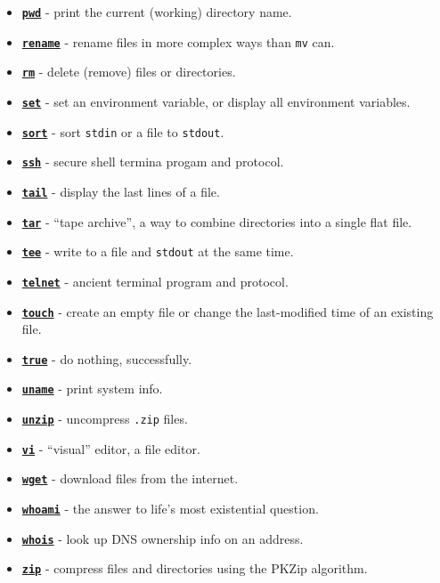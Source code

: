 \documentclass[10pt,]{book}
\numberwithin{figure}{chapter}
\begin{document}
\begin{itemize}
\item
  \href{linux.die.net/man/1/pwd}{\textbf{\texttt{pwd}}} - print the
  current (working) directory name.
\item
  \href{linux.die.net/man/1/rename}{\textbf{\texttt{rename}}} - rename
  files in more complex ways than \texttt{mv} can.
\item
  \href{linux.die.net/man/1/rm}{\textbf{\texttt{rm}}} - delete (remove)
  files or directories.
\item
  \href{linux.die.net/man/1/set}{\textbf{\texttt{set}}} - set an
  environment variable, or display all environment variables.
\item
  \href{linux.die.net/man/1/sort}{\textbf{\texttt{sort}}} - sort
  \texttt{stdin} or a file to \texttt{stdout}.
\item
  \href{http://linux.die.net/man/1/ssh}{\textbf{\texttt{ssh}}} - secure
  shell termina progam and protocol.
\item
  \href{http://linux.die.net/man/1/tail}{\textbf{\texttt{tail}}} -
  display the last lines of a file.
\item
  \href{http://linux.die.net/man/1/tar}{\textbf{\texttt{tar}}} - ``tape
  archive'', a way to combine directories into a single flat file.
\item
  \href{http://linux.die.net/man/1/tee}{\textbf{\texttt{tee}}} - write
  to a file and \texttt{stdout} at the same time.
\item
  \href{http://linux.die.net/man/1/telnet}{\textbf{\texttt{telnet}}} -
  ancient terminal program and protocol.
\item
  \href{http://linux.die.net/man/1/touch}{\textbf{\texttt{touch}}} -
  create an empty file or change the last-modified time of an existing
  file.
\item
  \href{http://linux.die.net/man/1/true}{\textbf{\texttt{true}}} - do
  nothing, successfully.
\item
  \href{http://linux.die.net/man/1/uname}{\textbf{\texttt{uname}}} -
  print system info.
\item
  \href{http://linux.die.net/man/1/unzip}{\textbf{\texttt{unzip}}} -
  uncompress \texttt{.zip} files.
\item
  \href{http://linux.die.net/man/1/vi}{\textbf{\texttt{vi}}} -
  ``visual'' editor, a file editor.
\item
  \href{http://linux.die.net/man/1/wget}{\textbf{\texttt{wget}}} -
  download files from the internet.
\item
  \href{http://linux.die.net/man/1/whoami}{\textbf{\texttt{whoami}}} -
  the answer to life's most existential question.
\item
  \href{http://linux.die.net/man/1/whois}{\textbf{\texttt{whois}}} -
  look up DNS ownership info on an address.
\item
  \href{http://linux.die.net/man/1/zip}{\textbf{\texttt{zip}}} -
  compress files and directories using the PKZip algorithm.
\end{itemize}
\end{document}
